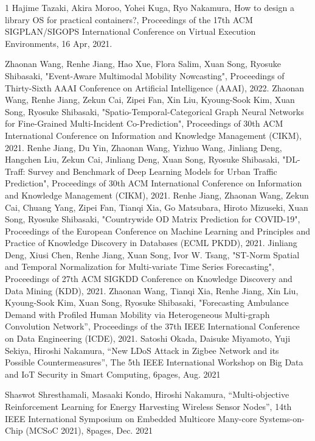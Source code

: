 \begin{査読付}{1}
Hajime Tazaki, Akira Moroo, Yohei Kuga, Ryo Nakamura, How to design a library OS for practical containers?, Proceedings of the 17th ACM SIGPLAN/SIGOPS International Conference on Virtual Execution Environments, 16 Apr, 2021.

Zhaonan Wang, Renhe Jiang, Hao Xue, Flora Salim, Xuan Song, Ryosuke Shibasaki, "Event-Aware Multimodal Mobility Nowcasting", Proceedings of Thirty-Sixth AAAI Conference on Artificial Intelligence (AAAI), 2022.
Zhaonan Wang, Renhe Jiang, Zekun Cai, Zipei Fan, Xin Liu, Kyoung-Sook Kim, Xuan Song, Ryosuke Shibasaki, "Spatio-Temporal-Categorical Graph Neural Networks for Fine-Grained Multi-Incident Co-Prediction", Proceedings of 30th ACM International Conference on Information and Knowledge Management (CIKM), 2021.
Renhe Jiang, Du Yin, Zhaonan Wang, Yizhuo Wang, Jinliang Deng, Hangchen Liu, Zekun Cai, Jinliang Deng, Xuan Song, Ryosuke Shibasaki, "DL-Traff: Survey and Benchmark of Deep Learning Models for Urban Traffic Prediction", Proceedings of 30th ACM International Conference on Information and Knowledge Management (CIKM), 2021.
Renhe Jiang, Zhaonan Wang, Zekun Cai, Chuang Yang, Zipei Fan, Tianqi Xia, Go Matsubara, Hiroto Mizuseki, Xuan Song, Ryosuke Shibasaki, "Countrywide OD Matrix Prediction for COVID-19", Proceedings of the European Conference on Machine Learning and Principles and Practice of Knowledge Discovery in Databases (ECML PKDD), 2021. 
Jinliang Deng, Xiusi Chen, Renhe Jiang, Xuan Song, Ivor W. Tsang, "ST-Norm Spatial and Temporal Normalization for Multi-variate Time Series Forecasting", Proceedings of 27th ACM SIGKDD Conference on Knowledge Discovery and Data Mining (KDD), 2021.
Zhaonan Wang, Tianqi Xia, Renhe Jiang, Xin Liu, Kyoung-Sook Kim, Xuan Song, Ryosuke Shibasaki, "Forecasting Ambulance Demand with Profiled Human Mobility via Heterogeneous Multi-graph Convolution Network”, Proceedings of the 37th IEEE International Conference on Data Engineering (ICDE), 2021. 
Satoshi Okada, Daisuke Miyamoto, Yuji Sekiya, Hiroshi Nakamura, ``New
LDoS Attack in Zigbee Network and its Possible Countermeasures'', The
5th IEEE International Workshop on Big Data and IoT Security in Smart
Computing, 6pages, Aug.  2021

Shaswot Shresthamali, Masaaki Kondo, Hiroshi Nakamura, ``Multi-objective
Reinforcement Learning for Energy Harvesting Wireless Sensor Nodes'',
14th IEEE International Symposium on Embedded Multicore Many-core
Systems-on-Chip (MCSoC 2021), 8pages, Dec. 2021


\end{査読付}
